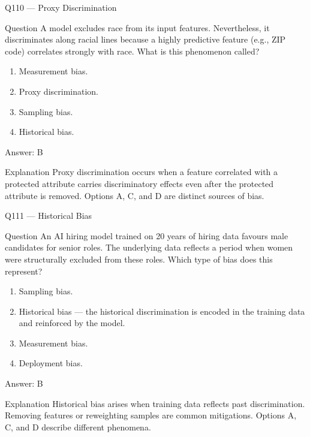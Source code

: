 \documentclass[aspectratio=169,8pt]{beamer}
\begin{document}
\begin{frame}{Q110 --- Proxy Discrimination}
\begin{block}{Question}
A model excludes race from its input features. Nevertheless, it discriminates along racial lines because a highly predictive feature (e.g., ZIP code) correlates strongly with race. What is this phenomenon called?
\end{block}
\begin{enumerate}
\item Measurement bias.
\item Proxy discrimination.
\item Sampling bias.
\item Historical bias.
\end{enumerate}
\begin{exampleblock}{Answer: B}\end{exampleblock}
\begin{block}{Explanation}
Proxy discrimination occurs when a feature correlated with a protected attribute carries discriminatory effects even after the protected attribute is removed. Options A, C, and D are distinct sources of bias.
\end{block}
\end{frame}

\begin{frame}{Q111 --- Historical Bias}
\begin{block}{Question}
An AI hiring model trained on 20 years of hiring data favours male candidates for senior roles. The underlying data reflects a period when women were structurally excluded from these roles. Which type of bias does this represent?
\end{block}
\begin{enumerate}
\item Sampling bias.
\item Historical bias --- the historical discrimination is encoded in the training data and reinforced by the model.
\item Measurement bias.
\item Deployment bias.
\end{enumerate}
\begin{exampleblock}{Answer: B}\end{exampleblock}
\begin{block}{Explanation}
Historical bias arises when training data reflects past discrimination. Removing features or reweighting samples are common mitigations. Options A, C, and D describe different phenomena.
\end{block}
\end{frame}
\end{document}
